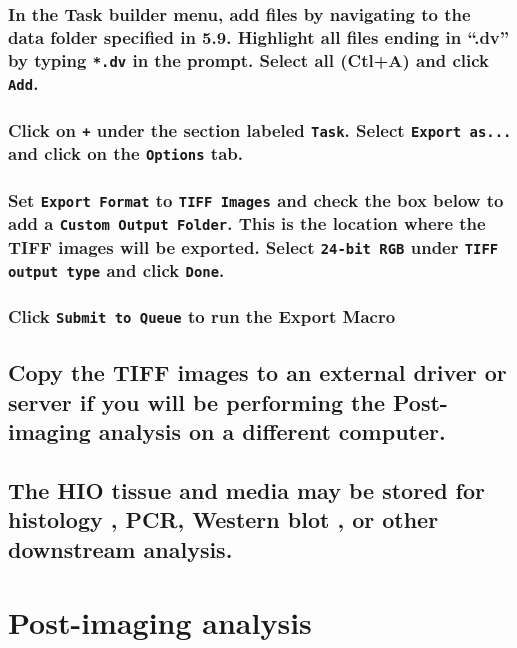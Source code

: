 \documentclass[11pt]{article}
\begin{document}
\subsubsection{{\sffamily } In the Task builder menu, add files by navigating to the data folder specified in 5.9. Highlight all files ending in “.dv” by typing \texttt{*.dv} in the prompt. Select all (Ctl+A) and click \texttt{Add}.}
\label{sec:orgheadline76}

\subsubsection{{\sffamily } Click on \texttt{+} under the section labeled \texttt{Task}. Select \texttt{Export as...} and click on the \texttt{Options} tab.}
\label{sec:orgheadline77}

\subsubsection{{\sffamily } Set \texttt{Export Format} to \texttt{TIFF Images} and check the box below to add a \texttt{Custom Output Folder}. This is the location where the TIFF images will be exported. Select \texttt{24-bit RGB} under \texttt{TIFF output type} and click \texttt{Done}.}
\label{sec:orgheadline78}

\subsubsection{{\sffamily } Click \texttt{Submit to Queue} to run the Export Macro}
\label{sec:orgheadline79}

\subsection{{\sffamily } Copy the TIFF images to an external driver or server if you will be performing the Post-imaging analysis on a different computer.}
\label{sec:orgheadline81}

\subsection{{\sffamily } The HIO tissue and media may be stored for histology \supercite{bancroft2008theory}, PCR\supercite{kennedy2011pcr}, Western blot \supercite{kurien2015western}, or other downstream analysis.}
\label{sec:orgheadline82}

\newpage
\section{{\sffamily } Post-imaging analysis}
\label{sec:orgheadline89}
\end{document}
